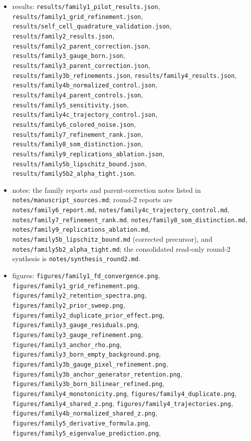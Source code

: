 \documentclass[12pt]{article}
\begin{document}
\begin{itemize}
\item results: \texttt{results/family1\_pilot\_results.json},
\texttt{results/family1\_grid\_refinement.json},
\texttt{results/self\_cell\_quadrature\_validation.json},
\texttt{results/family2\_results.json}, \texttt{results/family2\_parent\_correction.json},
\texttt{results/family3\_gauge\_born.json}, \texttt{results/family3\_parent\_correction.json},
\texttt{results/family3b\_refinements.json}, \texttt{results/family4\_results.json},
\texttt{results/family4b\_normalized\_control.json},
\texttt{results/family4\_parent\_controls.json}, \texttt{results/family5\_sensitivity.json},
\texttt{results/family4c\_trajectory\_control.json},
\texttt{results/family6\_colored\_noise.json},
\texttt{results/family7\_refinement\_rank.json},
\texttt{results/family8\_som\_distinction.json},
\texttt{results/family9\_replications\_ablation.json},
\texttt{results/family5b\_lipschitz\_bound.json},
\texttt{results/family5b2\_alpha\_tight.json}.
\item notes: the family reports and parent-correction notes listed in
\texttt{notes/manuscript\_sources.md}; round-2 reports are
\texttt{notes/family6\_report.md}, \texttt{notes/family4c\_trajectory\_control.md},
\texttt{notes/family7\_refinement\_rank.md}, \texttt{notes/family8\_som\_distinction.md},
\texttt{notes/family9\_replications\_ablation.md},
\texttt{notes/family5b\_lipschitz\_bound.md} (corrected precursor), and
\texttt{notes/family5b2\_alpha\_tight.md}; the consolidated read-only round-2
synthesis is \texttt{notes/synthesis\_round2.md}.
\item figures: \texttt{figures/family1\_fd\_convergence.png},
\texttt{figures/family1\_grid\_refinement.png},
\texttt{figures/family2\_retention\_spectra.png},
\texttt{figures/family2\_prior\_sweep.png}, \texttt{figures/family2\_duplicate\_prior\_effect.png},
\texttt{figures/family3\_gauge\_residuals.png}, \texttt{figures/family3\_gauge\_refinement.png},
\texttt{figures/family3\_anchor\_rho.png}, \texttt{figures/family3\_born\_empty\_background.png},
\texttt{figures/family3b\_gauge\_pixel\_refinement.png},
\texttt{figures/family3b\_anchor\_generator\_retention.png},
\texttt{figures/family3b\_born\_bilinear\_refined.png},
\texttt{figures/family4\_monotonicity.png}, \texttt{figures/family4\_duplicate.png},
\texttt{figures/family4\_shared\_z.png}, \texttt{figures/family4\_trajectories.png},
\texttt{figures/family4b\_normalized\_shared\_z.png},
\texttt{figures/family5\_derivative\_formula.png},
\texttt{figures/family5\_eigenvalue\_prediction.png},

\end{itemize}
\end{document}

